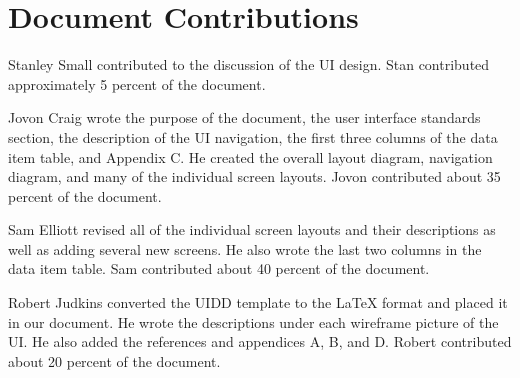 \documentclass{article}
\begin{document}
\newpage
\section{Document Contributions}

Stanley Small contributed to the discussion of the UI design. Stan contributed approximately 5 percent of the document.

Jovon Craig wrote the purpose of the document, the user interface standards section, the description of the UI navigation, the first three columns of the data item table, and Appendix C. He created the overall layout diagram, navigation diagram, and many of the individual screen layouts. Jovon contributed about 35 percent of the document.

Sam Elliott revised all of the individual screen layouts and their descriptions as well as adding several new screens. He also wrote the last two columns in the data item table. Sam contributed about 40 percent of the document.

Robert Judkins converted the UIDD template to the LaTeX format and placed it in our document. He wrote the descriptions under each wireframe picture of the UI. He also added the references and appendices A, B, and D. Robert contributed about 20 percent of the document.

\newpage




\newpage



\end{document}
